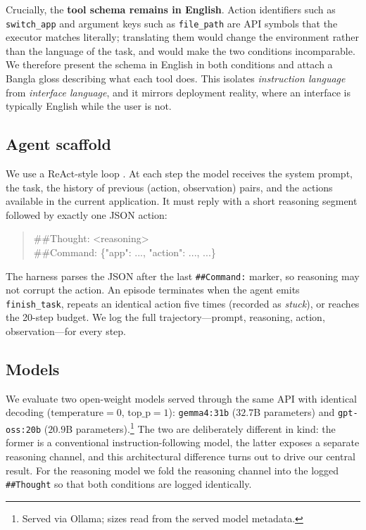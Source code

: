 \documentclass[11pt]{article}
\begin{document}
Crucially, the \textbf{tool schema remains in English}. Action identifiers such as
\texttt{switch\_app} and argument keys such as \texttt{file\_path} are API symbols that the
executor matches literally; translating them would change the environment rather than the
language of the task, and would make the two conditions incomparable. We therefore present the
schema in English in both conditions and attach a Bangla gloss describing what each tool does.
This isolates \emph{instruction language} from \emph{interface language}, and it mirrors
deployment reality, where an interface is typically English while the user is not.

\subsection{Agent scaffold}
We use a ReAct-style loop \citep{yao2023react}. At each step the model receives the system
prompt, the task, the history of previous (action, observation) pairs, and the actions
available in the current application. It must reply with a short reasoning segment followed by
exactly one JSON action:

\begin{quote}\small\ttfamily
\#\#Thought: \textless reasoning\textgreater \\
\#\#Command: \{"app": ..., "action": ..., ...\}
\end{quote}

The harness parses the JSON after the last \texttt{\#\#Command:} marker, so reasoning may not
corrupt the action. An episode terminates when the agent emits \texttt{finish\_task}, repeats an
identical action five times (recorded as \emph{stuck}), or reaches the 20-step budget. We log the
full trajectory---prompt, reasoning, action, observation---for every step.

\subsection{Models}
We evaluate two open-weight models served through the same API with identical decoding
($\mathrm{temperature}=0$, $\mathrm{top\_p}=1$): \texttt{gemma4:31b} ($32.7$B parameters) and
\texttt{gpt-oss:20b} ($20.9$B parameters).\footnote{Served via Ollama; sizes read from the
served model metadata.} The two are deliberately different in kind: the former is a
conventional instruction-following model, the latter exposes a separate reasoning channel, and
this architectural difference turns out to drive our central result. For the reasoning model we
fold the reasoning channel into the logged \texttt{\#\#Thought} so that both conditions are
logged identically.
\end{document}
